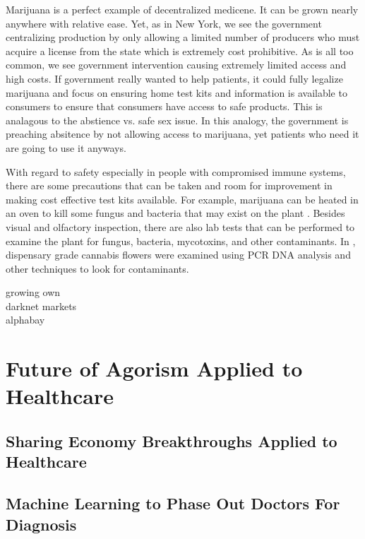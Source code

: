 \documentclass{article}
\begin{document}
Marijuana is a perfect example of decentralized medicene. It can be grown nearly anywhere with relative ease. Yet, as in New York, we see the government centralizing production by only allowing a limited number of producers who must acquire a license from the state which is extremely cost prohibitive. As is all too common, we see government intervention causing extremely limited access and high costs. If government really wanted to help patients, it could fully legalize marijuana and focus on ensuring home test kits and information is available to consumers to ensure that consumers have access to safe products. This is analagous to the abstience vs. safe sex issue. In this analogy, the government is preaching absitence by not allowing access to marijuana, yet patients who need it are going to use it anyways.

With regard to safety especially in people with compromised immune systems, there are some precautions that can be taken and room for improvement in making cost effective test kits available. For example, marijuana can be heated in an oven to kill some fungus and bacteria that may exist on the plant \cite{russo2014handbook}. Besides visual and olfactory inspection, there are also lab tests that can be performed to examine the plant for fungus, bacteria, mycotoxins, and other contaminants. In \cite{mckernan2015cannabis}, dispensary grade cannabis flowers were examined using PCR DNA analysis and other techniques to look for contaminants. 

growing own\\
darknet markets\\
alphabay\\


\section{Future of Agorism Applied to Healthcare}

\subsection{Sharing Economy Breakthroughs Applied to Healthcare}


\subsection{Machine Learning to Phase Out Doctors For Diagnosis}
\end{document}

